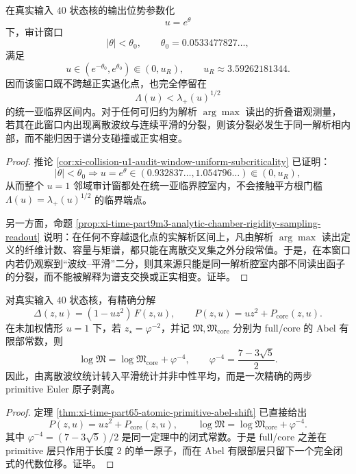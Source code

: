 \begin{theorem}[单一解析腔室内的波滑分裂]\label{thm:xi-time-part67-single-analytic-chamber-wave-smooth-splitting}
在真实输入 \(40\) 状态核的输出位势参数化
\[
u=e^\theta
\]
下，审计窗口
\[
|\theta|<\theta_0,
\qquad
\theta_0=0.0533477827\ldots,
\]
满足
\[
u\in (e^{-\theta_0},e^{\theta_0})
\Subset
(0,u_R),
\qquad
u_R\approx 3.59262181344.
\]
因而该窗口既不跨越正实退化点，也完全停留在
\[
\Lambda(u)<\lambda_+(u)^{1/2}
\]
的统一亚临界区间内。对于任何可归约为解析 \(\arg\max\) 读出的折叠谱观测量，若其在此窗口内出现离散波纹与连续平滑的分裂，则该分裂必发生于同一解析相内部，而不能归因于谱分支碰撞或正实相变。
\end{theorem}
\begin{proof}
推论 \ref{cor:xi-collision-u1-audit-window-uniform-subcriticality} 已证明：
\[
|\theta|<\theta_0
\Longrightarrow
u=e^\theta\in(0.932837\ldots,1.054796\ldots)\Subset(0,u_R),
\]
从而整个 \(u=1\) 邻域审计窗都处在统一亚临界腔室内，不会接触平方根门槛 \(\Lambda(u)=\lambda_+(u)^{1/2}\) 的临界端点。

另一方面，命题 \ref{prop:xi-time-part9m3-analytic-chamber-rigidity-sampling-readout} 说明：在任何不穿越退化点的实解析区间上，凡由解析 \(\arg\max\) 读出定义的纤维计数、容量与矩谱，都只能在离散交叉集之外分段常值。于是，在本窗口内若仍观察到“波纹--平滑”二分，则其来源只能是同一解析腔室内部不同读出函子的分裂，而不能被解释为谱支交换或正实相变。证毕。
\end{proof}

\begin{theorem}\label{thm:xi-time-part67-two-step-atomic-peeling-finitepart-shift}
对真实输入 \(40\) 状态核，有精确分解
\[
\Delta(z,u)=(1-uz^2)\,F(z,u),
\qquad
P(z,u)=uz^2+P_{\mathrm{core}}(z,u).
\]
在未加权情形 \(u=1\) 下，若 \(z_\star=\varphi^{-2}\)，并记 \(\mathfrak M,\mathfrak M_{\mathrm{core}}\) 分别为 full/core 的 Abel 有限部常数，则
\[
\log \mathfrak M
=
\log \mathfrak M_{\mathrm{core}}+\varphi^{-4},
\qquad
\varphi^{-4}=\frac{7-3\sqrt5}{2}.
\]
因此，由离散波纹统计转入平滑统计并非中性平均，而是一次精确的两步 primitive Euler 原子剥离。
\end{theorem}
\begin{proof}
定理 \ref{thm:xi-time-part65-atomic-primitive-abel-shift} 已直接给出
\[
P(z,u)=uz^2+P_{\mathrm{core}}(z,u),
\qquad
\log\mathfrak M=\log\mathfrak M_{\mathrm{core}}+\varphi^{-4}.
\]
其中 \(\varphi^{-4}=(7-3\sqrt5)/2\) 是同一定理中的闭式常数。于是 full/core 之差在 primitive 层只作用于长度 \(2\) 的单一原子，而在 Abel 有限部层只留下一个完全闭式的代数位移。证毕。
\end{proof}

